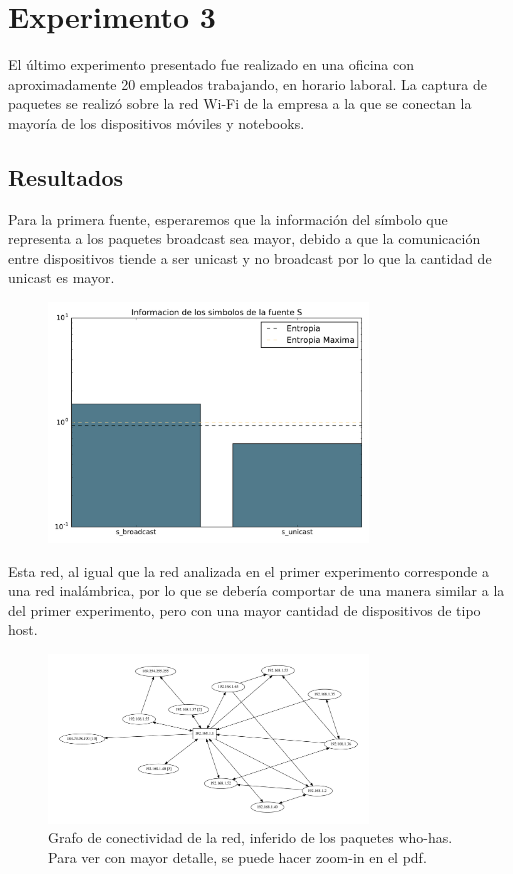 \section{Experimento 3}

\PARstart El último experimento presentado fue realizado en una oficina con aproximadamente 20 empleados trabajando, en horario laboral. La captura de paquetes se realizó sobre la red Wi-Fi de la empresa a la que se conectan la mayoría de los dispositivos móviles y notebooks.

\subsection{Resultados}

Para la primera fuente,  esperaremos que la información del símbolo que representa a los paquetes broadcast sea mayor, debido a que la comunicación entre dispositivos tiende a ser unicast y no broadcast por lo que la cantidad de unicast es mayor.

\begin{figure}[H]
  \centering
  \includegraphics[width=8.5cm]{exp_empresa/grafico1.pdf}
  \caption{\normalfont }
\end{figure}

Esta red, al igual que la red analizada en el primer experimento corresponde a una red inalámbrica, por lo que se debería comportar de una manera similar a la del primer experimento, pero con una mayor cantidad de dispositivos de tipo host.

\begin{figure}[H]
  \centering
  \includegraphics[width=8.5cm]{exp_empresa/grafico2.pdf}
  \caption{  \normalfont Grafo de conectividad de la red, inferido de los paquetes who-has. Para ver con mayor detalle, se puede hacer zoom-in en el pdf. }
\end{figure}


